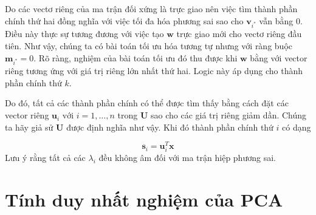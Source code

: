 \documentclass[14pt,oneside,a4paper]{report}
\numberwithin{equation}{section}
\begin{document}
Do các vectơ riêng của ma trận đối xứng là trực giao nên việc tìm thành phần chính thứ hai đồng nghĩa với việc tối đa hóa phương sai sao cho $\mathbf{v}_{i^{*}}$ vẫn bằng 0. Điều này thực sự tương đương với việc tạo $\mathbf{w}$ trực giao mới cho vectơ riêng đầu tiên. Như vậy, chúng ta có bài toán tối ưu hóa tương tự nhưng với ràng buộc $\mathbf{m}_{i^{*}}=0$. Rõ ràng, nghiệm của bài toán tối ưu đó thu được khi $\mathbf{w}$ bằng với vector riêng tương ứng với giá trị riêng lớn nhất thứ hai. Logic này áp dụng cho thành phần chính thứ $k$.

Do đó, tất cả các thành phần chính có thể được tìm thấy bằng cách đặt các vector riêng $\mathbf{u}_{i}\text { với } i=1, \ldots, n$ trong $\mathbf{U}$ sao cho các giá trị riêng giảm dần. Chúng ta hãy giả sử $\mathbf{U}$ được định nghĩa như vậy. Khi đó thành phần chính thứ $i$ có dạng

$$
\mathbf{s}_{i}=\mathbf{u}_{i}^{T}\mathbf{ x}
$$
Lưu ý rằng tất cả các $\lambda_{i}$ đều không âm đối với ma trận hiệp phương sai.

\section{Tính duy nhất nghiệm của PCA}
\end{document}
